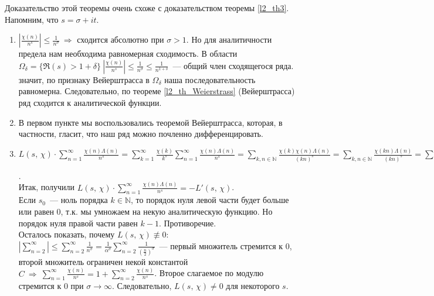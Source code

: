 \begin{pf}
	Доказательство этой теоремы очень схоже с доказательством теоремы \ref{l2_th3}. Напомним, что $s = \sigma + it$.
	\begin{enumerate}[nolistsep]
		\item[1)] $\displaystyle \left| \frac{\chi(n)}{n^s} \right| \leq \frac{1}{n^\sigma} \ \Rightarrow$ сходится абсолютно при $\sigma > 1$. Но для аналитичности предела нам необходима равномерная сходимость. В области $\displaystyle \Omega_\delta = \{ \Re(s) > 1+\delta \} \ \left| \frac{\chi(n)}{n^s} \right| \leq \frac{1}{n^\sigma} \leq \frac{1}{n^{1+\delta}}$ — общий член сходящегося ряда. значит, по признаку Вейерштрасса в $\Omega_\delta$ наша последовательность равномерна. Следовательно, по теореме \ref{l2_th_Weierstrass} (Вейерштрасса) ряд сходится к аналитической функции.
		\item[2)] В первом пункте мы воспользовались теоремой Вейерштрасса, которая, в частности, гласит, что наш ряд можно почленно дифференцировать.
		\item[3)] $\displaystyle L(s,\,\chi)\cdot\sum\limits_{n=1}^\infty \frac{\chi(n)\Lambda(n)}{n^s} = \sum\limits_{k=1}^\infty \frac{\chi(k)}{k^s} \sum\limits_{n=1}^\infty \frac{\chi(n)\Lambda(n)}{n^s} = \sum\limits_{k,n \in \mathbb{N}} \frac{\chi(k)\chi(n)\Lambda(n)}{(kn)^s} = \sum\limits_{k,n \in \mathbb{N}} \frac{\chi(kn)\Lambda(n)}{(kn)^s} = \sum\limits_{\substack{n \in \mathbb{N} \\ d \vert n}} \frac{\chi(n)\Lambda(d)}{n^s} = \sum\limits_{n \in \mathbb{N}} \frac{\chi(n) \ln(n)}{n^s} = -L'(s,\,\chi)$.\\
			Итак, получили $\displaystyle L(s,\,\chi) \cdot \sum\limits_{n=1}^\infty \frac{\chi(n)\Lambda(n)}{n^s} = -L'(s,\,\chi)$.\\
			Если $s_0$ — ноль порядка $k \in \mathbb{N}$, то порядок нуля левой части будет больше или равен $0$, т.к. мы умножаем на некую аналитическую функцию. Но порядок нуля правой части равен $k-1$. Противоречие.\\
Осталось показать, почему $L(s, \, \chi) \not\equiv 0$: $\displaystyle \left| \sum\limits_{n=2}^\infty \right| \leq \sum\limits_{n=2}^\infty \frac{1}{n^\sigma} = \frac{1}{\alpha^\sigma}\sum\limits_{n=2}^\infty \frac{1}{\left( \frac{n}{2}\right)^\sigma}$ — первый множитель стремится к $0$, второй множитель ограничен некой константой $\displaystyle C \ \Rightarrow \ \sum\limits_{n=1}^\infty \frac{\chi(n)}{n^s} = 1+\sum\limits_{n=2}^\infty \frac{\chi(n)}{n^s}$. Второе слагаемое по модулю стремится к $0$ при $\sigma \to \infty$. Следовательно, $L(s, \, \chi) \ne 0$ для некоторого $s$.
	\end{enumerate}
\end{pf}